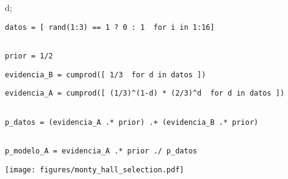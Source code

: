 \documentclass[shownotes,aspectratio=169]{beamer}
\begin{document}
\begin{frame}[plain]
\begin{textblock}{80}
{     {d};
}

\vspace{0.75cm}
\end{textblock}

\end{frame}

\begin{frame}

\begin{lstlisting}[belowskip=-0.6 \baselineskip]
datos = [ rand(1:3) == 1 ? 0 : 1  for i in 1:16]
\end{lstlisting}
\pause
\begin{lstlisting}[belowskip=-0.6 \baselineskip]

prior = 1/2
\end{lstlisting}
\pause
\begin{lstlisting}[belowskip=-0.6 \baselineskip]
evidencia_B = cumprod([ 1/3  for d in datos ])
\end{lstlisting}
\pause
\begin{lstlisting}[belowskip=-0.6 \baselineskip]
evidencia_A = cumprod([ (1/3)^(1-d) * (2/3)^d  for d in datos ])
\end{lstlisting}
\pause
\begin{lstlisting}[belowskip=-0.6 \baselineskip]

p_datos = (evidencia_A .* prior) .+ (evidencia_B .* prior)
\end{lstlisting}
\pause
\begin{lstlisting}

p_modelo_A = evidencia_A .* prior ./ p_datos
\end{lstlisting}

\end{frame}

\begin{frame}[plain]

\vspace{0.75cm}
\centering
\texttt{[image: figures/monty\_hall\_selection.pdf]} \hspace{1cm}

\end{frame}
\end{document}
